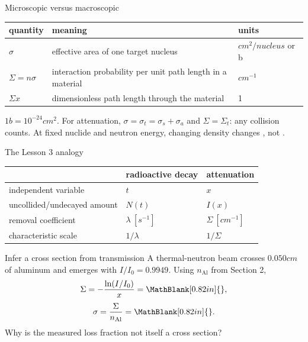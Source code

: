 \begin{handoutcolumns}
\begin{fixedbox}{Microscopic versus macroscopic}
\footnotesize
\scriptsize
\begin{tabularx}{\linewidth}{@{}>{\bfseries}l X X@{}}
\toprule
quantity & meaning & units\\
\midrule
$\sigma$ & effective area of one target nucleus & $\unit{cm^2/nucleus}$ or b\\
$\Sigma=n\sigma$ & interaction probability per unit path length in a material & $\unit{cm^{-1}}$\\
$\Sigma x$ & dimensionless path length through the material & 1\\
\bottomrule
\end{tabularx}
\footnotesize
\smallskip
$1\unit{b}=10^{-24}\unit{cm^2}$. For attenuation,
$\sigma=\sigma_t=\sigma_s+\sigma_a$ and $\Sigma=\Sigma_t$: any collision
counts. At fixed nuclide and neutron energy, changing density changes
\RevealBlank[0.62in]{}, not \RevealBlank[0.62in]{}.
\normalsize
\end{fixedbox}

\begin{fixedbox}{The Lesson 3 analogy}
\centering\scriptsize
\begin{tabular}{@{}lll@{}}
\toprule
 & radioactive decay & attenuation\\
\midrule
independent variable & $t$ & $x$\\
uncollided/undecayed amount & $N(t)$ & $I(x)$\\
removal coefficient & $\lambda\ [\unit{s^{-1}}]$ & $\Sigma\ [\unit{cm^{-1}}]$\\
characteristic scale & $1/\lambda$ & $1/\Sigma$\\
\bottomrule
\end{tabular}
\end{fixedbox}

\begin{boardbox}{Infer a cross section from transmission}
A thermal-neutron beam crosses $0.050\unit{cm}$ of aluminum and emerges with
$I/I_0=0.9949$. Using $n_{\mathrm{Al}}$ from Section 2,
\[
 \Sigma=-\frac{\ln(I/I_0)}{x}
 =\MathBlank[0.82in]{},
\]
\[
 \sigma=\frac{\Sigma}{n_{\mathrm{Al}}}
 =\MathBlank[0.82in]{}.
\]
Why is the measured loss fraction not itself a cross section?
\end{boardbox}

\end{handoutcolumns}

